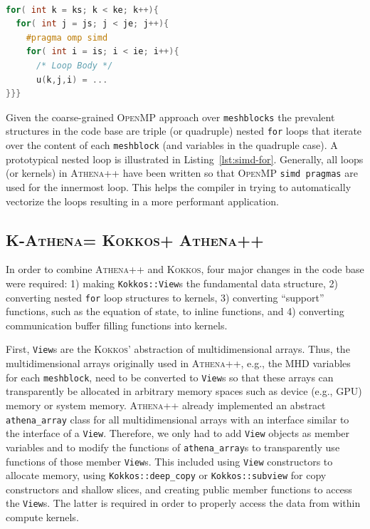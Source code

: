 \documentclass[10pt,journal,compsoc]{IEEEtran}
\newcommand{\textcode}[1]{\textsc{#1}}
\newcommand{\kokkos}{\textcode{Kokkos}\xspace}
\newcommand{\athena}{\textcode{Athena++}\xspace}
\newcommand{\kathena}{\textcode{K-Athena}\xspace}
\newcommand{\openmp}{\textcode{OpenMP}\xspace}
\begin{document}
\begin{lstlisting}[language=C++,label=lst:simd-for,caption={
Example triple \lstinline!for! loop for a typical
operation in a finite volume method on a structured mesh such as in a
code like \athena, where \lstinline!ks!, \lstinline!ke!, \lstinline!js!,
\lstinline!je!, \lstinline!is!, and \lstinline!ie! are loop bounds and
\lstinline!u! is an \texttt{athena\_array} object of, for example,
an MHD variable.
}]

for( int k = ks; k < ke; k++){
  for( int j = js; j < je; j++){
    #pragma omp simd
    for( int i = is; i < ie; i++){
      /* Loop Body */
      u(k,j,i) = ...
}}}
\end{lstlisting} 
Given the coarse-grained \openmp approach over \texttt{meshblocks} the prevalent 
structures in the code base are triple (or quadruple) nested \texttt{for} loops
that iterate over the content of each \texttt{meshblock} (and variables in the quadruple
case).
A prototypical nested loop is illustrated in Listing~\ref{lst:simd-for}.
Generally, all loops (or kernels) in \athena have been written so that \openmp 
\texttt{simd pragmas} are used for the innermost loop.
This helps the compiler in trying to automatically vectorize the loops resulting
in a more performant application.



\subsection{\kathena = \kokkos + \athena}
\label{sec:kathena-loops}

In order to combine \athena and \kokkos, four major changes in the
code base were required: 1) making \texttt{Kokkos::View}s the fundamental
data structure, 2) converting nested \texttt{for} loop structures to kernels,
3) converting ``support'' functions, such as the equation of state, to inline functions, and
4) converting communication buffer filling functions into kernels.

First, \texttt{View}s are the \kokkos' abstraction of multidimensional arrays.
Thus, the multidimensional arrays originally used in \athena, e.g., the MHD variables
for each \texttt{meshblock}, need to be converted to \texttt{View}s so that these
arrays can transparently be allocated in arbitrary memory spaces such as device (e.g., GPU)
memory or system memory.
\athena already implemented an abstract \texttt{athena\_array} class for all
multidimensional arrays with an interface similar to the interface of a \texttt{View}.
Therefore, we only had to add \texttt{View} objects as member variables and 
to modify the functions of \texttt{athena\_array}s to transparently use 
functions of those member \texttt{View}s.
This included using \texttt{View} constructors to allocate memory, using
\texttt{Kokkos::deep\_copy} or \texttt{Kokkos::subview} for copy constructors and 
shallow slices, and creating public member functions to access the \texttt{View}s.
The latter is required in order to properly access the data from within compute kernels.
\end{document}
